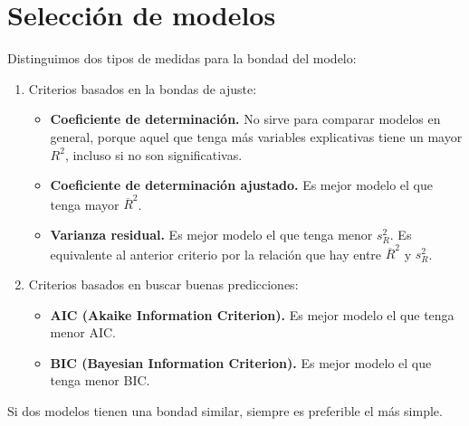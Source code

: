 \section{Selección de modelos}
Distinguimos dos tipos de medidas para la bondad del modelo:
\begin{enumerate}
    \item Criterios basados en la bondas de ajuste:
          \begin{itemize}
              \item \textbf{Coeficiente de determinación.}
                    No sirve para comparar modelos en general, porque aquel que tenga más variables explicativas tiene un mayor $R^2$, incluso si no son significativas.
              \item \textbf{Coeficiente de determinación ajustado.}
                    Es mejor modelo el que tenga mayor $\overline{R}^2$.
              \item \textbf{Varianza residual.}
                    Es mejor modelo el que tenga menor $s_R^2$.
                    Es equivalente al anterior criterio por la relación que hay entre $\overline{R}^2$ y $s_R^2$.
          \end{itemize}
    \item Criterios basados en buscar buenas predicciones:
          \begin{itemize}
              \item \textbf{AIC (Akaike Information Criterion).}
                    Es mejor modelo el que tenga menor AIC.
              \item \textbf{BIC (Bayesian Information Criterion).}
                    Es mejor modelo el que tenga menor BIC.
          \end{itemize}
\end{enumerate}

Si dos modelos tienen una bondad similar, siempre es preferible el más simple.

